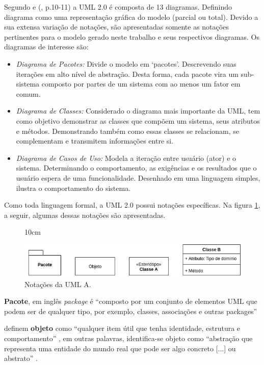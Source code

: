 Segundo  e (\citeyear{silva2007classesuml}, p.10-11) a UML 2.0 é composta de 13 diagramas. Definindo diagrama como uma representação gráfica do modelo (parcial ou total). Devido a sua extensa variação de notações, são apresentadas somente as notações pertinentes para o modelo gerado neste trabalho e seus respectivos diagramas. 
Os diagramas de interesse são: 
\begin{itemize}
    \item \textit{Diagrama de Pacotes:} Divide o modelo em `pacotes'. Descrevendo suas iterações em alto nível de abstração. Desta forma, cada pacote vira um sub-sistema composto por partes de um sistema com ao menos um fator em comum.
    \item \textit{Diagrama de Classes:} Considerado o diagrama mais importante da UML, tem como objetivo demonstrar as classes que compõem um sistema, seus atributos e métodos. Demonstrando também como essas classes se relacionam, se complementam e transmitem informações entre si.
    \item \textit{Diagrama de Casos de Uso:} Modela a iteração entre usuário (ator) e o sistema. Determinando o comportamento, as exigências e os resultados que o usuário espera de uma funcionalidade. Desenhado em uma linguagem simples, ilustra o comportamento do sistema.
\end{itemize}

Como toda linguagem formal, a UML 2.0 possui notações específicas. Na figura \ref{uml_obj}, a seguir, algumas dessas notações são apresentadas.

\begin{figure}[!ht]{10cm}
  \caption{Notações da UML A.} \label{uml_obj}
  \includegraphics[width=1\hsize]{figuras/uml_obj.png}
\end{figure}

\textbf{Pacote}, em inglês \textit{package} é ``composto por um conjunto de elementos UML que podem ser de qualquer tipo, por exemplo, classes, associações e outras packages'' \cite[p.47]{queiroz2006tutorial}

 definem \textbf{objeto} como ``qualquer item útil que tenha identidade, estrutura e comportamento'' \cite[p.46]{chonoles2011uml}, em outras palavras, identifica-se objeto como ``abstração que representa uma entidade do mundo real que pode ser algo concreto [...] ou abstrato'' \cite[p.]{tacla2007analise}.


